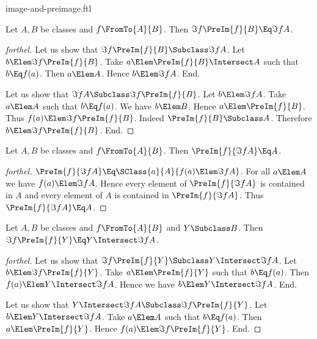 \documentclass{stex}
\begin{document}
\begin{smodule}{image-and-preimage.ftl}
\begin{proposition*}[forthel]
  Let $A, B$ be classes and $f \FromTo{A}{B}$.
  Then $\Im{f}{\PreIm{f}{B}} \Eq \Im{f}{A}$.
\end{proposition*}
\begin{proof}[forthel]
  Let us show that $\Im{f}{\PreIm{f}{B}} \Subclass \Im{f}{A}$.
    Let $b \Elem \Im{f}{\PreIm{f}{B}}$.
    Take $a \Elem \PreIm{f}{B} \Intersect A$ such that $b \Eq f(a)$.
    Then $a \Elem A$.
    Hence $b \Elem \Im{f}{A}$.
  End.

  Let us show that $\Im{f}{A} \Subclass \Im{f}{\PreIm{f}{B}}$.
    Let $b \Elem \Im{f}{A}$.
    Take $a \Elem A$ such that $b \Eq f(a)$.
    We have $b \Elem B$.
    Hence $a \Elem \PreIm{f}{B}$.
    Thus $f(a) \Elem \Im{f}{\PreIm{f}{B}}$.
    Indeed $\PreIm{f}{B} \Subclass A$.
    Therefore $b \Elem \Im{f}{\PreIm{f}{B}}$.
  End.
\end{proof}

\begin{proposition*}[forthel]
  Let $A, B$ be classes and $f \FromTo{A}{B}$.
  Then $\PreIm{f}{\Im{f}{A}} \Eq A$.
\end{proposition*}
\begin{proof}[forthel]
  $\PreIm{f}{\Im{f}{A}} \Eq \SClass{a}{A}{f(a) \Elem \Im{f}{A}}$.
  For all $a \Elem A$ we have $f(a) \Elem \Im{f}{A}$.
  Hence every element of $\PreIm{f}{\Im{f}{A}}$ is contained in $A$ and every element of $A$ is contained in $\PreIm{f}{\Im{f}{A}}$.
  Thus $\PreIm{f}{\Im{f}{A}} \Eq A$.
\end{proof}

\begin{proposition*}[forthel]
  Let $A, B$ be classes and $f \FromTo{A}{B}$ and $Y \Subclass B$.
  Then $\Im{f}{\PreIm{f}{Y}} \Eq Y \Intersect \Im{f}{A}$.
\end{proposition*}
\begin{proof}[forthel]
  Let us show that $\Im{f}{\PreIm{f}{Y}} \Subclass Y \Intersect \Im{f}{A}$.
    Let $b \Elem \Im{f}{\PreIm{f}{Y}}$.
    Take $a \Elem \PreIm{f}{Y}$ such that $b \Eq f(a)$.
    Then $f(a) \Elem Y \Intersect \Im{f}{A}$.
    Hence we have $b \Elem Y \Intersect \Im{f}{A}$.
  End.

  Let us show that $Y \Intersect \Im{f}{A} \Subclass \Im{f}{\PreIm{f}{Y}}$.
    Let $b \Elem Y \Intersect \Im{f}{A}$.
    Take $a \Elem A$ such that $b \Eq f(a)$.
    Then $a \Elem \PreIm{f}{Y}$.
    Hence $f(a) \Elem \Im{f}{\PreIm{f}{Y}}$.
  End.
\end{proof}


\end{smodule}
\end{document}
